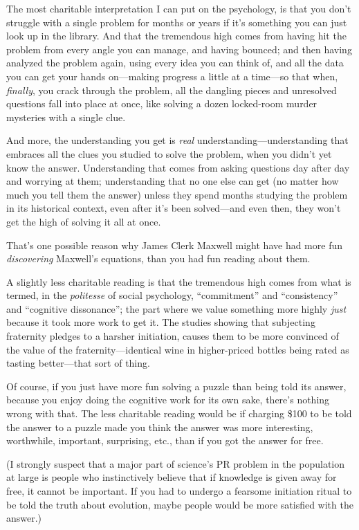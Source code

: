 {
 The most charitable interpretation I can put on the psychology, is
that you don't struggle with a single problem for
months or years if it's something you can just look up
in the library. And that the tremendous high comes from having hit the
problem from every angle you can manage, and having bounced; and then
having analyzed the problem again, using every idea you can think of,
and all the data you can get your hands on---making progress a little
at a time---so that when, \textit{finally}, you crack through the
problem, all the dangling pieces and unresolved questions fall into
place at once, like solving a dozen locked-room murder mysteries with a
single clue.}

{
 And more, the understanding you get is \textit{real}
understanding---understanding that embraces all the clues you studied
to solve the problem, when you didn't yet know the
answer. Understanding that comes from asking questions day after day
and worrying at them; understanding that no one else can get (no matter
how much you tell them the answer) unless they spend months studying
the problem in its historical context, even after it's
been solved---and even then, they won't get the high of
solving it all at once.}

{
 That's one possible reason why James Clerk Maxwell
might have had more fun \textit{discovering} Maxwell's
equations, than you had fun reading about them.}

{
 A slightly less charitable reading is that the tremendous high
comes from what is termed, in the \textit{politesse} of social
psychology, ``commitment'' and
``consistency'' and
``cognitive dissonance''; the part
where we value something more highly \textit{just} because it took more
work to get it. The studies showing that subjecting fraternity pledges
to a harsher initiation, causes them to be more convinced of the value
of the fraternity---identical wine in higher-priced bottles being rated
as tasting better---that sort of thing.}

{
 Of course, if you just have more fun solving a puzzle than being
told its answer, because you enjoy doing the cognitive work for its own
sake, there's nothing wrong with that. The less
charitable reading would be if charging \$100 to be told the answer to
a puzzle made you think the answer was more interesting, worthwhile,
important, surprising, etc., than if you got the answer for free.}

{
 (I strongly suspect that a major part of science's
PR problem in the population at large is people who instinctively
believe that if knowledge is given away for free, it cannot be
important. If you had to undergo a fearsome initiation ritual to be
told the truth about evolution, maybe people would be more satisfied
with the answer.)}

